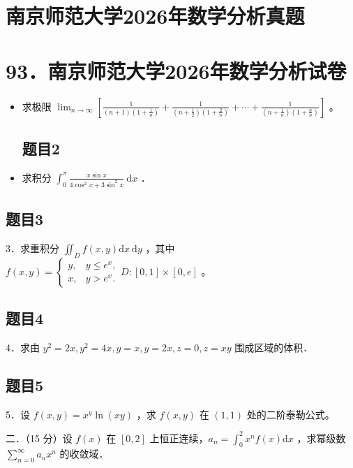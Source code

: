 \documentclass{article}
\begin{document}
\section*{南京师范大学2026年数学分析真题}
\section*{93．南京师范大学2026年数学分析试卷}
\begin{itemize}

\subsection{题目1}
  \item[1．] 求极限 \(\lim _{n \rightarrow \infty}\left[\frac{1}{(n+1)\left(1+\frac{1}{n}\right)}+\frac{1}{\left(n+\frac{1}{2}\right)\left(1+\frac{2}{n}\right)}+\cdots+\frac{1}{\left(n+\frac{1}{n}\right)\left(1+\frac{n}{n}\right)}\right]\) 。

\subsection{题目2}
  \item[2．] 求积分 \(\int_{0}^{\pi} \frac{x \sin x}{4 \cos ^{2} x+3 \sin ^{2} x} \mathrm{~d} x\) ．
\end{itemize}

\subsection{题目3}
3．求重积分 \(\iint_{D} f(x, y) \mathrm{d} x \mathrm{~d} y\) ，其中 \(f(x, y)=\left\{\begin{array}{cc}y, & y \leq e^{x}, \\ x, & y>e^{x} .\end{array} D:[0,1] \times[0, e]\right.\) 。

\subsection{题目4}
4．求由 \(y^{2}=2 x, y^{2}=4 x, y=x, y=2 x, z=0, z=x y\) 围成区域的体积．

\subsection{题目5}
5．设 \(f(x, y)=x^{y} \ln (x y)\) ，求 \(f(x, y)\) 在 \((1,1)\) 处的二阶泰勒公式。

二．（15 分）设 \(f(x)\) 在 \([0,2]\) 上恒正连续，\(a_{n}=\int_{0}^{2} x^{n} f(x) \mathrm{d} x\) ，求幂级数 \(\sum_{n=0}^{\infty} a_{n} x^{n}\) 的收敛域．
\end{document}
